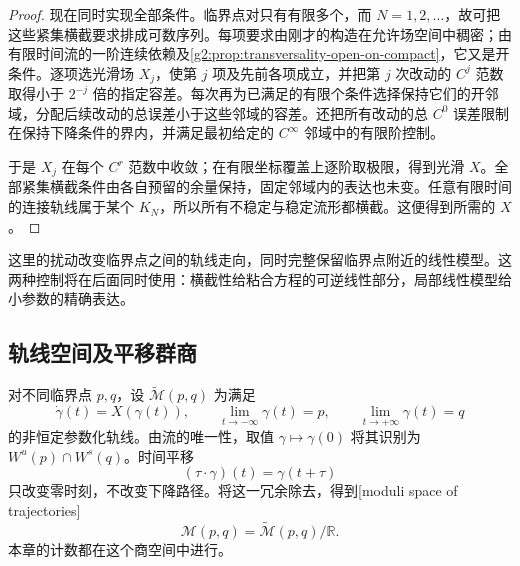 \begin{proof}
	现在同时实现全部条件。临界点对只有有限多个，而 \(N=1,2,\ldots\)，故可把这些紧集横截要求排成可数序列。每项要求由刚才的构造在允许场空间中稠密；由有限时间流的一阶连续依赖及\cref{g2:prop:transversality-open-on-compact}，它又是开条件。逐项选光滑场 \(X_j\)，使第 \(j\) 项及先前各项成立，并把第 \(j\) 次改动的 \(C^j\) 范数取得小于 \(2^{-j}\) 倍的指定容差。每次再为已满足的有限个条件选择保持它们的开邻域，分配后续改动的总误差小于这些邻域的容差。还把所有改动的总 \(C^0\) 误差限制在保持下降条件的界内，并满足最初给定的 \(C^\infty\) 邻域中的有限阶控制。

	于是 \(X_j\) 在每个 \(C^r\) 范数中收敛；在有限坐标覆盖上逐阶取极限，得到光滑 \(X\)。全部紧集横截条件由各自预留的余量保持，固定邻域内的表达也未变。任意有限时间的连接轨线属于某个 \(K_N\)，所以所有不稳定与稳定流形都横截。这便得到所需的 \(X\)。
\end{proof}

这里的扰动改变临界点之间的轨线走向，同时完整保留临界点附近的线性模型。这两种控制将在后面同时使用：横截性给粘合方程的可逆线性部分，局部线性模型给小参数的精确表达。

\subsection{轨线空间及平移群商}
\label{g2:subsec:1801:04}

对不同临界点 \(p,q\)，设 \(\widetilde{\mathcal M}(p,q)\) 为满足
\[
	\dot\gamma(t)=X(\gamma(t)),\qquad
	\lim_{t\to-\infty}\gamma(t)=p,\qquad
	\lim_{t\to+\infty}\gamma(t)=q
\]
的非恒定参数化轨线。由流的唯一性，取值 \(\gamma\mapsto\gamma(0)\) 将其识别为 \(W^u(p)\cap W^s(q)\)。时间平移
\[
	(\tau\cdot\gamma)(t)=\gamma(t+\tau)
\]
只改变零时刻，不改变下降路径。将这一冗余除去，得到[moduli space of trajectories]
\[
	\mathcal M(p,q)=\widetilde{\mathcal M}(p,q)/\mathbb R.
\]
本章的计数都在这个商空间中进行。

